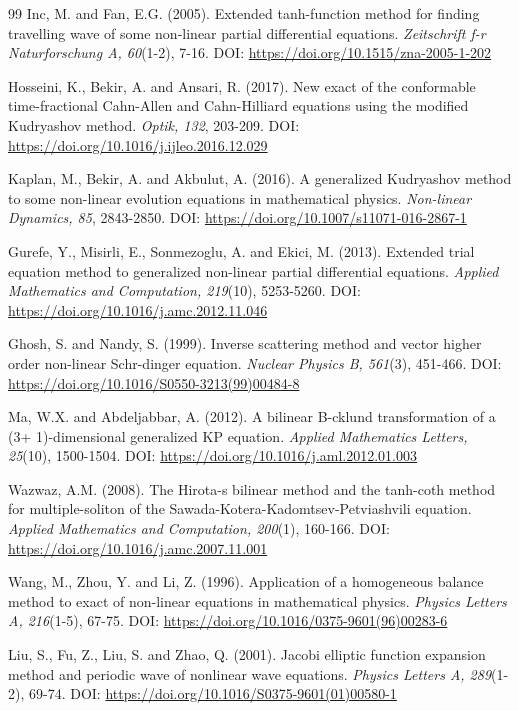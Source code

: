 \documentclass[10pt]{NSP1}
\numberwithin{equation}{section}
\begin{document}
\begin{thebibliography}{99}
 Inc, M. and Fan, E.G. (2005). Extended tanh-function method for finding travelling wave  of some non-linear partial differential equations. \emph{Zeitschrift f-r Naturforschung A, 60}(1-2), 7-16. DOI: \url{https://doi.org/10.1515/zna-2005-1-202}

 Hosseini, K., Bekir, A. and Ansari, R. (2017). New exact  of the conformable time-fractional Cahn-Allen and Cahn-Hilliard equations using the modified Kudryashov method. \emph{Optik, 132}, 203-209. DOI: \url{https://doi.org/10.1016/j.ijleo.2016.12.029}

 Kaplan, M., Bekir, A. and Akbulut, A. (2016). A generalized Kudryashov method to some non-linear evolution equations in mathematical physics. \emph{Non-linear Dynamics, 85}, 2843-2850. DOI: \url{https://doi.org/10.1007/s11071-016-2867-1}

 Gurefe, Y., Misirli, E., Sonmezoglu, A. and Ekici, M. (2013). Extended trial equation method to generalized non-linear partial differential equations. \emph{Applied Mathematics and Computation, 219}(10), 5253-5260. DOI: \url{https://doi.org/10.1016/j.amc.2012.11.046}

 Ghosh, S. and Nandy, S. (1999). Inverse scattering method and vector higher order non-linear Schr-dinger equation. \emph{Nuclear Physics B, 561}(3), 451-466. DOI: \url{https://doi.org/10.1016/S0550-3213(99)00484-8}

 Ma, W.X. and Abdeljabbar, A. (2012). A bilinear B-cklund transformation of a (3+ 1)-dimensional generalized KP equation. \emph{Applied Mathematics Letters, 25}(10), 1500-1504. DOI: \url{https://doi.org/10.1016/j.aml.2012.01.003}

 Wazwaz, A.M. (2008). The Hirota-s bilinear method and the tanh-coth method for multiple-soliton  of the Sawada-Kotera-Kadomtsev-Petviashvili equation. \emph{Applied Mathematics and Computation, 200}(1), 160-166. DOI: \url{https://doi.org/10.1016/j.amc.2007.11.001}

 Wang, M., Zhou, Y. and Li, Z. (1996). Application of a homogeneous balance method to exact  of non-linear equations in mathematical physics. \emph{Physics Letters A, 216}(1-5), 67-75. DOI: \url{https://doi.org/10.1016/0375-9601(96)00283-6}

 Liu, S., Fu, Z., Liu, S. and Zhao, Q. (2001). Jacobi elliptic function expansion method and periodic wave  of nonlinear wave equations. \emph{Physics Letters A, 289}(1-2), 69-74. DOI: \url{https://doi.org/10.1016/S0375-9601(01)00580-1}

\end{thebibliography}
\end{document}
